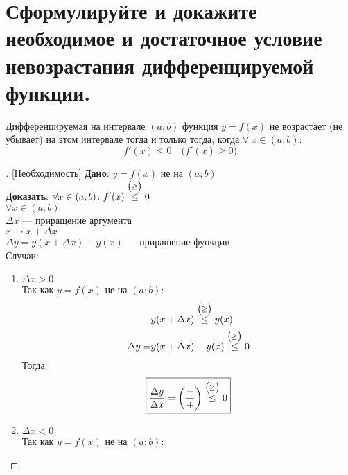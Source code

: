 \newpage
\section{Сформулируйте и докажите необходимое и достаточное условие невозрастания дифференцируемой функции.}

\begin{theorem}
	Дифференцируемая на интервале $(a;b)$ функция $y=f(x)$ не возрастает (не убывает) на этом интервале тогда и только тогда, когда $\forall\ x \in (a;b)\colon$
	\[ f'(x) \le 0\quad \Big(f'(x) \ge 0\Big) \]
\end{theorem}
\begin{proof}[][Необходимость]
	\textbf{Дано}: $y=f(x)$ не  на $(a;b)$\\
	\textbf{Доказать}: $\forall x \in (a;b)\colon f'(x) \overset{\scriptsize{\big(\ge \big)}}{\le} 0$\\
	$\forall x \in (a;b)$\\
	$\Delta x$ --- приращение аргумента\\
	$x \to x + \Delta x$\\
	$\Delta y = y(x + \Delta x) - y(x)$ --- приращение функции\\
	Случаи:
	\begin{enumerate}
		\item $\Delta x > 0$\\
          Так как $y=f(x)$ не  на $(a;b)$: \vspace{-\topsep}
          \begin{align*}
            & y(x+\Delta x) \overset{\scriptsize{\big(\ge \big)}}{\le} y(x) \\
            \Delta y = & y(x + \Delta x) - y(x) \overset{\scriptsize{\big(\ge \big)}}{\le} 0
          \end{align*} \vspace{-\topsep}
          Тогда:
          \begin{gather*}
            \boxed{\frac{\Delta y}{\Delta x} = \left(\frac{-}{+}\right) \overset{\scriptsize{\big(\ge \big)}}{\le} 0}
          \end{gather*}
    \item $\Delta x < 0$\\
          Так как $y=f(x)$ не  на $(a;b)$: \vspace{-\topsep}

\end{enumerate}
\end{proof}
